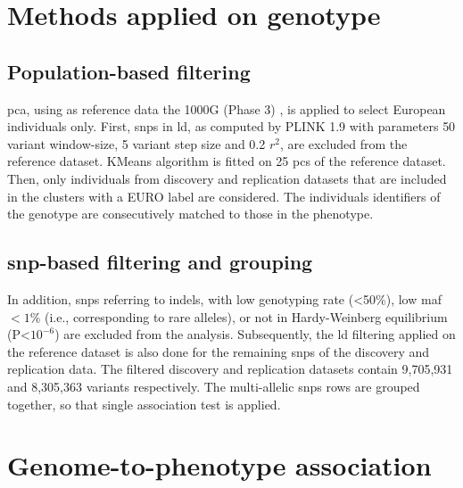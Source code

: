 \section{Methods applied on genotype}
\subsection{Population-based filtering}
\ac{pca}, using as reference data the 1000G (Phase 3) \cite{Auton2015}, is applied to select European individuals only. First, \acp{snp} in \ac{ld}, as computed by PLINK 1.9 with parameters 50 variant window-size, 5 variant step size and 0.2 $r^2$, are excluded from the reference dataset. KMeans algorithm is fitted on 25 \acp{pc} of the reference dataset. Then, only individuals from discovery and replication datasets that are included in the clusters with a EURO label are considered. The individuals identifiers of the genotype are consecutively matched to those in the phenotype.

\subsection{\acs{snp}-based filtering and grouping}
\label{sub:snpbased_filt}
 In addition, \acp{snp} referring to indels, with low genotyping rate (<50\%), low \ac{maf} $<1\%$ (i.e., corresponding to rare alleles), or not in Hardy-Weinberg equilibrium (P<$10^{-6}$) are excluded from the analysis. Subsequently, the \ac{ld} filtering applied on the reference dataset is also done for the remaining \acp{snp} of the discovery and replication data. The filtered discovery and replication datasets contain 9,705,931 and 8,305,363 variants respectively. The multi-allelic \acp{snp} rows are grouped together, so that single association test is applied.

\section{Genome-to-phenotype association}
